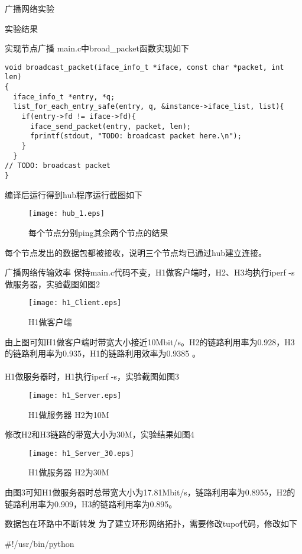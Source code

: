\documentclass{article} %
\begin{document}
\begin{section}{广播网络实验}
\begin{subsection}{实验结果}
\begin{subsubsection}{实现节点广播}
				main.c中broad\_packet函数实现如下
				\begin{lstlisting}[language={[ANSI]C}]
void broadcast_packet(iface_info_t *iface, const char *packet, int len)
{
  iface_info_t *entry, *q;
  list_for_each_entry_safe(entry, q, &instance->iface_list, list){
    if(entry->fd != iface->fd){
	  iface_send_packet(entry, packet, len);
	  fprintf(stdout, "TODO: broadcast packet here.\n");
	}
  }
// TODO: broadcast packet 
}
				\end{lstlisting}
				编译后运行得到hub程序运行截图如下
				\begin{figure}[h]	
					\centering
					\texttt{[image: hub\_1.eps]}	
					\caption{每个节点分别ping其余两个节点的结果}
				\end{figure}
			每个节点发出的数据包都被接收，说明三个节点均已通过hub建立连接。
			\end{subsubsection}
		\begin{subsubsection}{广播网络传输效率}
			保持main.c代码不变，H1做客户端时，H2、H3均执行iperf -s做服务器，实验截图如图2\\
			\begin{figure}[h]	
				\centering
				\texttt{[image: h1\_Client.eps]}	
				\caption{H1做客户端}
			\end{figure}
		由上图可知H1做客户端时带宽大小接近10Mbit/s。H2的链路利用率为0.928，H3的链路利用率为0.935，H1的链路利用效率为0.9385
		。\\
		\\
		H1做服务器时，H1执行iperf -s，实验截图如图3\\
			\begin{figure}[h]	
				\centering
				\texttt{[image: h1\_Server.eps]}	
				\caption{H1做服务器 H2为10M}
			\end{figure}
		修改H2和H3链路的带宽大小为30M，实验结果如图4\\
			\begin{figure}[h]	
				\centering
				\texttt{[image: h1\_Server\_30.eps]}	
				\caption{H1做服务器 H2为30M}
			\end{figure}
		由图3可知H1做服务器时总带宽大小为17.81Mbit/s，链路利用率为0.8955，H2的链路利用率为0.909，H3的链路利用率为0.895。
		\end{subsubsection}	
	\begin{subsubsection}{数据包在环路中不断转发}
		为了建立环形网络拓扑，需要修改tupo代码，修改如下
		\begin{python}
#!/usr/bin/python


\end{python}
\end{subsubsection}
\end{subsection}
\end{section}
\end{document}
